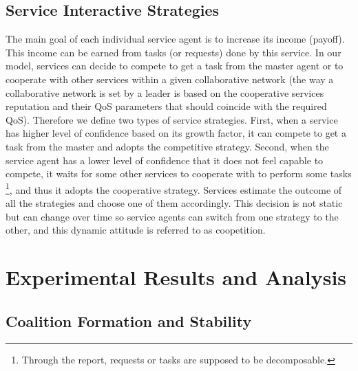 %


\subsection{Service Interactive Strategies}

The main goal of each individual service agent is to increase its
income (payoff). This income can be earned from tasks (or
requests) done by this service. In our model, services can decide
to compete to get a task from the master agent or to cooperate
with other services within a given collaborative network (the way
a collaborative network is set by a leader is based on the
cooperative services reputation and their QoS parameters that
should coincide with the required QoS). Therefore we define two
types of service strategies. First, when a service has higher
level of confidence based on its growth factor, it can compete to
get a task from the master and adopts the competitive strategy.
Second, when the service agent has a lower level of confidence
that it does not feel capable to compete, it waits for some other
services to cooperate with to perform some tasks \footnote{Through
the report, requests or tasks are supposed to be decomposable.},
and thus it adopts the cooperative strategy. Services estimate the
outcome of all the strategies and choose one of them accordingly.
This decision is not static but can change over time so service
agents can switch from one strategy to the other, and this dynamic
attitude is referred to as coopetition.



\section{Experimental Results and Analysis}\label{s:resutls}

\subsection{Coalition Formation and Stability}


